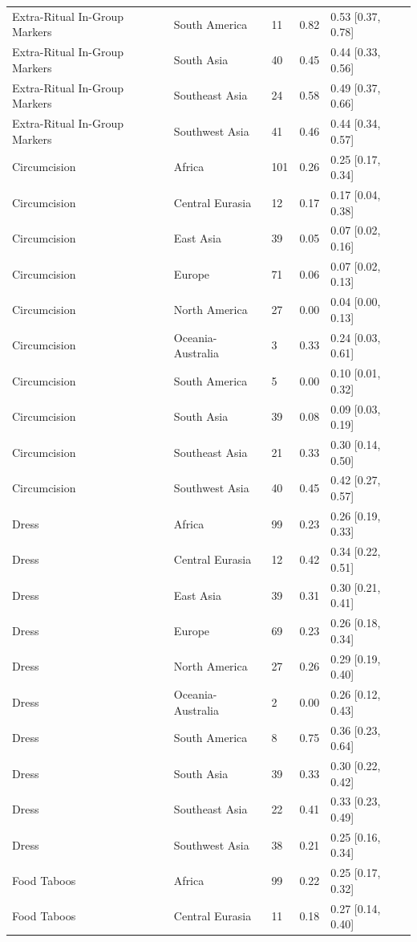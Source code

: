 \begin{longtable}{lllll}
Extra-Ritual In-Group Markers & South America & 11 & 0.82 & 0.53 [0.37, 0.78] \\
Extra-Ritual In-Group Markers & South Asia & 40 & 0.45 & 0.44 [0.33, 0.56] \\
Extra-Ritual In-Group Markers & Southeast Asia & 24 & 0.58 & 0.49 [0.37, 0.66] \\
Extra-Ritual In-Group Markers & Southwest Asia & 41 & 0.46 & 0.44 [0.34, 0.57] \\
Circumcision & Africa & 101 & 0.26 & 0.25 [0.17, 0.34] \\
Circumcision & Central Eurasia & 12 & 0.17 & 0.17 [0.04, 0.38] \\
Circumcision & East Asia & 39 & 0.05 & 0.07 [0.02, 0.16] \\
Circumcision & Europe & 71 & 0.06 & 0.07 [0.02, 0.13] \\
Circumcision & North America & 27 & 0.00 & 0.04 [0.00, 0.13] \\
Circumcision & Oceania-Australia & 3 & 0.33 & 0.24 [0.03, 0.61] \\
Circumcision & South America & 5 & 0.00 & 0.10 [0.01, 0.32] \\
Circumcision & South Asia & 39 & 0.08 & 0.09 [0.03, 0.19] \\
Circumcision & Southeast Asia & 21 & 0.33 & 0.30 [0.14, 0.50] \\
Circumcision & Southwest Asia & 40 & 0.45 & 0.42 [0.27, 0.57] \\
Dress & Africa & 99 & 0.23 & 0.26 [0.19, 0.33] \\
Dress & Central Eurasia & 12 & 0.42 & 0.34 [0.22, 0.51] \\
Dress & East Asia & 39 & 0.31 & 0.30 [0.21, 0.41] \\
Dress & Europe & 69 & 0.23 & 0.26 [0.18, 0.34] \\
Dress & North America & 27 & 0.26 & 0.29 [0.19, 0.40] \\
Dress & Oceania-Australia & 2 & 0.00 & 0.26 [0.12, 0.43] \\
Dress & South America & 8 & 0.75 & 0.36 [0.23, 0.64] \\
Dress & South Asia & 39 & 0.33 & 0.30 [0.22, 0.42] \\
Dress & Southeast Asia & 22 & 0.41 & 0.33 [0.23, 0.49] \\
Dress & Southwest Asia & 38 & 0.21 & 0.25 [0.16, 0.34] \\
Food Taboos & Africa & 99 & 0.22 & 0.25 [0.17, 0.32] \\
Food Taboos & Central Eurasia & 11 & 0.18 & 0.27 [0.14, 0.40] \\

\end{longtable}
